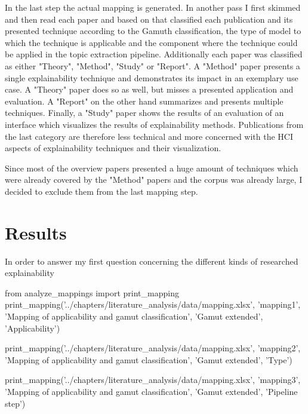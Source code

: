 \begin{enumerate}
	In the last step the actual mapping is generated. In another pass I first skimmed and then read each paper and based on that classified each publication and its presented technique according to the Gamuth classification, the type of model to which the technique is applicable and the component where the technique could be applied in the topic extraction pipeline. Additionally each paper was classified as either "Theory", "Method", "Study" or "Report". 
	A "Method" paper presents a single explainability technique and demonstrates its impact in an exemplary use case. A "Theory" paper does so as well, but misses a presented application and evaluation. A "Report" on the other hand summarizes and presents multiple techniques. Finally, a "Study" paper shows the results of an evaluation of an interface which visualizes the results of explainability methods. Publications from the last category are therefore less technical and more concerned with the HCI aspects of explainability techniques and their visualization.
	
	Since most of the overview papers presented a huge amount of techniques which were already covered by the "Method" papers and the corpus was already large, I decided to exclude them from the last mapping step.

\end{enumerate}

\section{Results}

In order to answer my first question concerning the different kinds of researched explainability 

\begin{pycode}
from analyze_mappings import print_mapping
print_mapping('../chapters/literature_analysis/data/mapping.xlsx', 'mapping1', 'Mapping of applicability and gamut classification', 'Gamut extended', 'Applicability')

print_mapping('../chapters/literature_analysis/data/mapping.xlsx', 'mapping2', 'Mapping of applicability and gamut classification', 'Gamut extended', 'Type')

print_mapping('../chapters/literature_analysis/data/mapping.xlsx', 'mapping3', 'Mapping of applicability and gamut classification', 'Gamut extended', 'Pipeline step')
\end{pycode}

